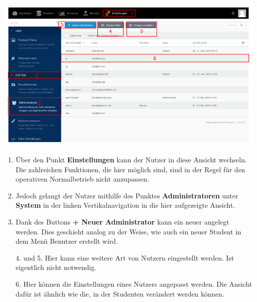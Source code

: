   \includegraphics[scale=0.3]{backend/img/settings_1.png}
  \begin{enumerate}
   \item Über den Punkt \textbf{Einstellungen} kann der Nutzer in diese Ansicht wechseln.
	 Die zahlreichen Funktionen, die hier möglich sind, sind in der Regel für den operativen Normalbetrieb nicht anzupassen.
   \item Jedoch gelangt der Nutzer mithilfe des Punktes \textbf{Administratoren} unter \textbf{System} in der linken Vertikalnavigation in die hier aufgezeigte Ansicht.
   \item Dank des Buttons \textbf{+ Neuer Administrator} kann ein neuer angelegt werden. 
	 Dies geschieht analog zu der Weise, wie auch ein neuer Student in dem Menü Benutzer erstellt wird.
   \item[4. und 5.] Hier kann eine weitere Art von Nutzern eingestellt werden. Ist eigentlich nicht notwendig.
   \item[6.] Hier können die Einstellungen eines Nutzers angepasst werden. 
	 Die Ansicht dafür ist ähnlich wie die, in der Studenten verändert werden können.
  \end{enumerate}

    